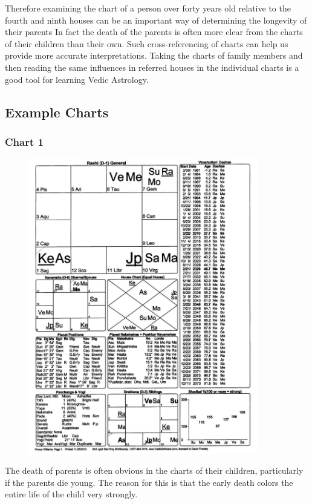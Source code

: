 

Therefore examining the chart of a person over forty years old relative to the fourth and ninth houses can be an important way of determining the longevity of their parents In fact the death of the parents is often more clear from the charts of their children than their own. Such cross-referencing of charts can help us provide more accurate interpretations. Taking the charts of family members and then reading the same influences in referred houses in the individual charts is a good tool for learning Vedic Astrology.

 

\subsection{Example Charts}
\subsubsection{Chart 1}

 
\begin{figure}[h]
\centering
\includegraphics[width=10cm]{pics/Lesson6chart1.jpg}
\caption{}
\end{figure}

The death of parents is often obvious in the charts of their children, particularly if the parents die young. The reason for this is that the early death colors the entire life of the child very strongly.

